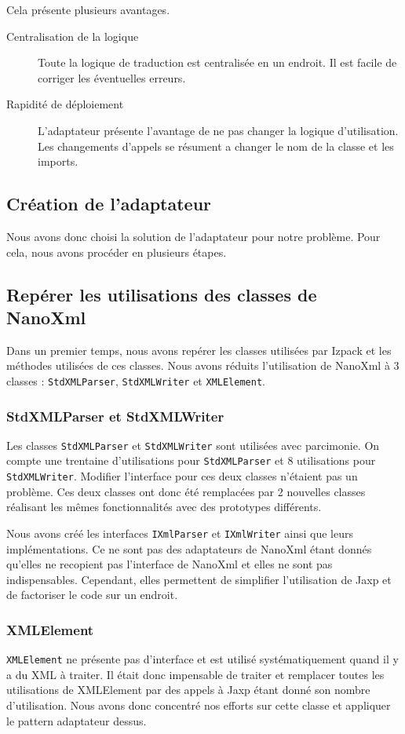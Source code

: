 Cela présente plusieurs avantages.
\begin{description}
\item[Centralisation de la logique] Toute la logique de traduction est centralisée en un endroit. Il est facile de corriger les éventuelles erreurs.
\item[Rapidité de déploiement] L'adaptateur présente l'avantage de ne pas changer la logique d'utilisation. Les changements d'appels se résument a changer le nom de la classe et les imports.
\end{description}
\subsection{Création de l'adaptateur}
Nous avons donc choisi la solution de l'adaptateur pour notre problème. Pour cela, nous avons procéder en plusieurs étapes.

\subsection{Repérer les utilisations des classes de NanoXml}
Dans un premier temps, nous avons repérer les classes utilisées par Izpack et les méthodes utilisées de ces classes.
Nous avons réduits l'utilisation de NanoXml à 3 classes : \verb|StdXMLParser|, \verb|StdXMLWriter| et \verb|XMLElement|.

\subsubsection{StdXMLParser et StdXMLWriter}
Les classes \verb|StdXMLParser| et \verb|StdXMLWriter| sont utilisées avec parcimonie.
On compte une trentaine d'utilisations pour \verb|StdXMLParser| et 8 utilisations pour \verb|StdXMLWriter|.
Modifier l'interface pour ces deux classes n'étaient pas un problème.
Ces deux classes ont donc été remplacées par 2 nouvelles classes réalisant les mêmes fonctionnalités avec des prototypes différents.

Nous avons créé les interfaces \verb|IXmlParser| et \verb|IXmlWriter| ainsi que leurs implémentations.
Ce ne sont pas des adaptateurs de NanoXml étant donnés qu'elles ne recopient pas l'interface de NanoXml et elles ne sont pas indispensables.
Cependant, elles permettent de simplifier l'utilisation de Jaxp et de factoriser le code sur un endroit.

\subsubsection{XMLElement}
\verb|XMLElement| ne présente pas d'interface et est utilisé systématiquement quand il y a du XML à traiter.
Il était donc impensable de traiter et remplacer toutes les utilisations de XMLElement par des appels à Jaxp étant donné son nombre d'utilisation.
Nous avons donc concentré nos efforts sur cette classe et appliquer le pattern adaptateur dessus.

